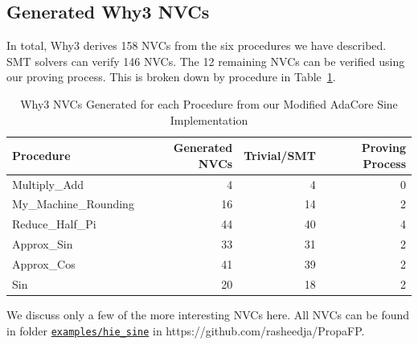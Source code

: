 \documentclass[runningheads]{llncs}
\begin{document}
\subsection{Generated Why3 NVCs}
In total, Why3 derives 158 NVCs from the six procedures we have described.
SMT solvers can verify 146 NVCs.
The 12 remaining NVCs can be verified using our proving process.
This is broken down by procedure in Table~\ref{table:hieVCs}. 

\begin{table}[t]
  \caption{Why3 NVCs Generated for each Procedure from our Modified AdaCore Sine Implementation}
  \label{table:hieVCs}
  \centering
  \begin{tabular}{l@{\kern1em}r@{\kern1em}r@{\kern1em}r}
  \toprule
  Procedure             & Generated NVCs & Trivial/SMT & Proving 
  Process \\
  \midrule
  Multiply\_Add         & 4                       & 4                             & 0                                           \\
  My\_Machine\_Rounding & 16                       & 14                           & 2                                           \\
  Reduce\_Half\_Pi      & 44                      & 40                            & 4                                           \\
  Approx\_Sin           & 33                      & 31                            & 2                                           \\
  Approx\_Cos           & 41                      & 39                            & 2                                           \\
  Sin                   & 20                      & 18                             & 2                                           \\
  \bottomrule
  \end{tabular}
\end{table}

We discuss only a few of the more interesting NVCs here.
All NVCs can be found in folder \href{https://github.com/rasheedja/PropaFP/tree/master/examples/hie_sine/txt}{\texttt{examples/hie\_sine}} in https://github.com/rasheedja/PropaFP.
\end{document}
